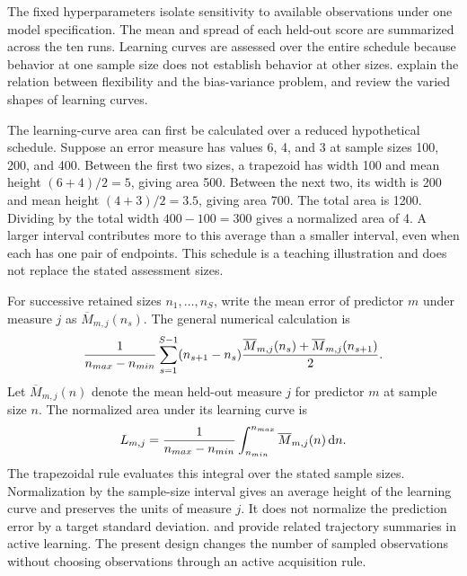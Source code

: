 The fixed hyperparameters isolate sensitivity to available observations under one model specification. The mean and spread of each held-out score are summarized across the ten runs. Learning curves are assessed over the entire schedule because behavior at one sample size does not establish behavior at other sizes. \citet{Geman1992} explain the relation between flexibility and the bias-variance problem, and \citet{VieringLoog2023} review the varied shapes of learning curves.

The learning-curve area can first be calculated over a reduced hypothetical schedule. Suppose an error measure has values 6, 4, and 3 at sample sizes 100, 200, and 400. Between the first two sizes, a trapezoid has width 100 and mean height \((6+4)/2=5\), giving area 500. Between the next two, its width is 200 and mean height \((4+3)/2=3.5\), giving area 700. The total area is 1200. Dividing by the total width \(400-100=300\) gives a normalized area of 4. A larger interval contributes more to this average than a smaller interval, even when each has one pair of endpoints. This schedule is a teaching illustration and does not replace the stated assessment sizes.

For successive retained sizes \(n_1,\ldots,n_S\), write the mean error of predictor \(m\) under measure \(j\) as \(\overline M_{m,j}(n_s)\). The general numerical calculation is
\begin{equation}
\equationname{Trapezoidal approximation of normalized learning-curve area}
\label{eq:icsor_learning_area_trapezoids}
\frac{1}{n_{max}-n_{min}}
\sum_{s=1}^{S-1}(n_{s+1}-n_s)
\frac{\overline M_{m,j}(n_s)+\overline M_{m,j}(n_{s+1})}{2}.
\end{equation}
Let \(\overline M_{m,j}(n)\) denote the mean held-out measure \(j\) for predictor \(m\) at sample size \(n\). The normalized area under its learning curve is
\begin{equation}
\equationname{Integral definition of normalized learning-curve area}
\label{eq:icsor_learning_area}
L_{m,j}=\frac{1}{n_{max}-n_{min}}
\int_{n_{min}}^{n_{max}}\overline M_{m,j}(n)\,\mathrm{d}n.
\end{equation}
The trapezoidal rule evaluates this integral over the stated sample sizes. Normalization by the sample-size interval gives an average height of the learning curve and preserves the units of measure \(j\). It does not normalize the prediction error by a target standard deviation. \citet{Cawley2011} and \citet{Guyon2011} provide related trajectory summaries in active learning. The present design changes the number of sampled observations without choosing observations through an active acquisition rule.

